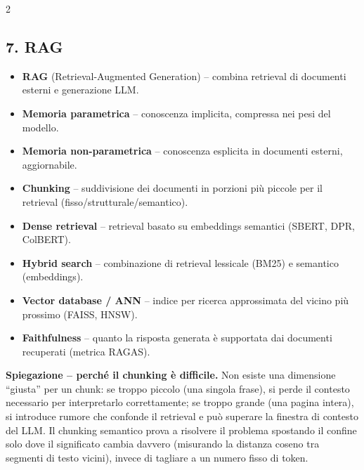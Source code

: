 \documentclass[10pt,a4paper]{extarticle}
\begin{document}
\begin{multicols}{2}
\subsection*{7. RAG}
\begin{itemize}
\item \textbf{RAG} (Retrieval-Augmented Generation) -- combina retrieval di documenti esterni e generazione LLM.
\item \textbf{Memoria parametrica} -- conoscenza implicita, compressa nei pesi del modello.
\item \textbf{Memoria non-parametrica} -- conoscenza esplicita in documenti esterni, aggiornabile.
\item \textbf{Chunking} -- suddivisione dei documenti in porzioni pi\`u piccole per il retrieval (fisso/strutturale/semantico).
\item \textbf{Dense retrieval} -- retrieval basato su embeddings semantici (SBERT, DPR, ColBERT).
\item \textbf{Hybrid search} -- combinazione di retrieval lessicale (BM25) e semantico (embeddings).
\item \textbf{Vector database / ANN} -- indice per ricerca approssimata del vicino pi\`u prossimo (FAISS, HNSW).
\item \textbf{Faithfulness} -- quanto la risposta generata \`e supportata dai documenti recuperati (metrica RAGAS).
\end{itemize}
\smallskip\noindent\textbf{\textcolor{blue!45!black}{Spiegazione -- perch\'e il chunking \`e difficile.}} Non esiste una dimensione ``giusta'' per un chunk: se troppo piccolo (una singola frase), si perde il contesto necessario per interpretarlo correttamente; se troppo grande (una pagina intera), si introduce rumore che confonde il retrieval e pu\`o superare la finestra di contesto del LLM. Il chunking semantico prova a risolvere il problema spostando il confine solo dove il significato cambia davvero (misurando la distanza coseno tra segmenti di testo vicini), invece di tagliare a un numero fisso di token.


\end{multicols}
\end{document}
